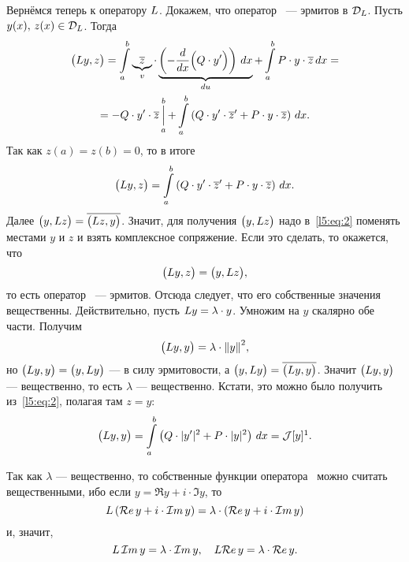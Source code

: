 Вернёмся теперь к оператору $L$. Докажем, что оператор \LL\ --- эрмитов в $\mathcal{D}_{L}$. Пусть $y(x),\,z(x)\in\mathcal{D}_{L}$. Тогда
\begin{multline*}
	\big(L y,z\big)=\int\limits_a^b \underbrace{\overline{z}}_{v}\cdot\underbrace{\left(-\frac{d}{dx}\Big(Q\cdot y'\Big)\right)\,dx}_{du}+\int\limits_a^b P\cdot y\cdot\overline{z}\,dx=\\=-Q\cdot y'\cdot\overline{z}\mathop{\Big|}\limits_a^b+\int\limits_a^b\left(Q\cdot y'\cdot\overline{z}'+P\cdot y\cdot\overline{z}\right)\,dx.
\end{multline*}
Так как $z(a)=z(b)=0$, то в итоге 
\begin{equation}
	\label{l5:eq:2}
	\big(L y,z\big)=\int\limits_a^b\left(Q\cdot y'\cdot\overline{z}'+P\cdot y\cdot\overline{z}\right)\,dx.
\end{equation}
Далее $\big(y,L z\big)=\overline{\big(L z,y\big)}$. Значит{\mb,} для получения $\big(y,L z\big)$ надо в~\eqref{l5:eq:2} {\mb поменять местами $y$ и $z$}
и взять комплексное сопряжение. Если это сделать, то окажется, что
\begin{equation*}
	\big(L y,z\big)=\big(y,L z\big),
\end{equation*} 
то есть оператор \LL\ --- эрмитов. Отсюда следует, что его собственные значения вещественны. Действительно, пусть $L y=\lambda\cdot y$. Умножим на $y$ скалярно обе части. Получим
\begin{equation*}
	\big(L y,y\big)=\lambda\cdot{\ensuremath{\left\|y\right\|}}^2,
\end{equation*}
но $\big(L y,y\big)=\big(y,L y\big)$ --- в силу эрмитовости, а $\big(y,L y\big)=\overline{\big(L y,y\big)}$. Значит $\big(L y,y\big)$ --- вещественно, то есть $\lambda$ --- вещественно. Кстати, это можно было получить из~\eqref{l5:eq:2}, полагая там $z=y$:
\begin{equation}
	\label{l5:eq:3}
	 \big(\LL y,y\big)=\int\limits_a^b\left(Q\cdot|y'|^2+P\cdot|y|^2\right)\,dx=\J[y]\footnotemark{}.
\end{equation}%

Так как $\lambda$ --- вещественно, то собственные функции оператора \LL\ можно считать вещественными, ибо если $y=\Re y+i\cdot\Im y$, то 
\begin{equation*}
	L\left(\mathcal{R}e\, y+i\cdot\mathcal{I}m\, y\right)=\lambda\cdot\left(\mathcal{R}e\, y+i\cdot\mathcal{I}m\, y\right)
\end{equation*} 
и{\mb,} значит{\mb,} 
\begin{equation*}
	L\,\mathcal{I}m\, y=\lambda\cdot\mathcal{I}m\, y,\quad L\mathcal{R}e\, y=\lambda\cdot\mathcal{R}e\, y.
\end{equation*}

